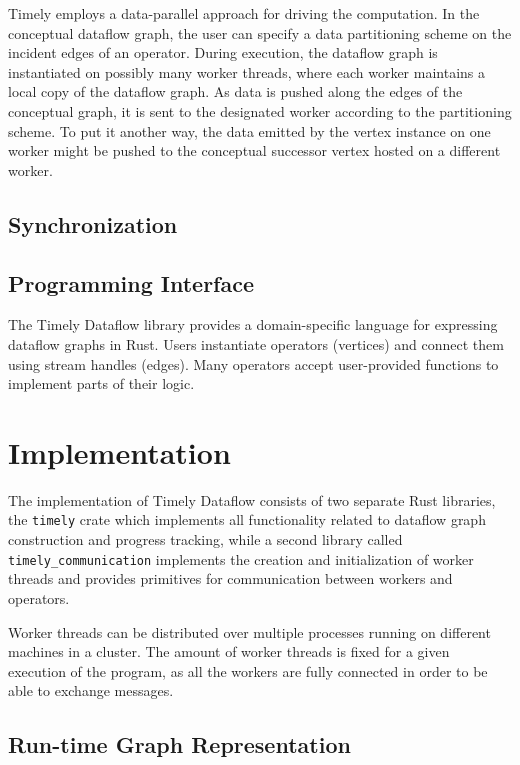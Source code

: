 \begin{addedbar}
Timely employs a data-parallel approach for driving the computation. In the
conceptual dataflow graph, the user can specify a data partitioning scheme
on the incident edges of an operator. During execution, the dataflow graph
is instantiated on possibly many worker threads, where each worker maintains
a local copy of the dataflow graph. As data is pushed along the edges of the
conceptual graph, it is sent to the designated worker according to the
partitioning scheme. To put it another way, the data emitted by the vertex
instance on one worker might be pushed to the conceptual successor vertex
hosted on a different worker.

\subsection{Synchronization}





\subsection{Programming Interface}

The Timely Dataflow library provides a domain-specific language for expressing
dataflow graphs in Rust. Users instantiate operators (vertices) and connect
them using stream handles (edges). Many operators accept user-provided functions
to implement parts of their logic.

\section{Implementation}

The implementation of Timely Dataflow consists of two separate Rust libraries,
the \lstinline{timely} crate which implements all functionality related to
dataflow graph construction and progress tracking, while a second library
called \lstinline{timely_communication} implements the creation and
initialization of worker threads and provides primitives for communication
between workers and operators. 

Worker threads can be distributed over multiple processes running on different
machines in a cluster. 
The amount of worker threads is fixed for a given execution of the program, as
all the workers are fully connected in order to be able to exchange messages.

\subsection{Run-time Graph Representation} \label{sec:runtime-graph}


\end{addedbar}
